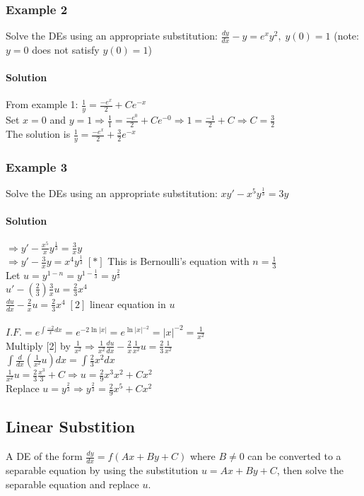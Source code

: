 \documentclass{article}
\begin{document}
\subsubsection{Example 2}
Solve the DEs using an appropriate substitution: $\frac{dy}{dx}-y=e^xy^2,\;y(0)=1$ (note: $y=0$ does not satisfy $y(0)=1$)
\paragraph{Solution} From example 1: $\frac{1}{y}=\frac{-e^x}{2}+Ce^{-x}$
\\Set $x=0$ and $y=1\Rightarrow \frac{1}{1}=\frac{-e^0}{2}+Ce^{-0}\Rightarrow1=\frac{-1}{2}+C\Rightarrow C=\frac{3}{2}$
\\The solution is $\frac{1}{y}=\frac{-e^x}{2}+\frac{3}{2}e^{-x}$

\subsubsection{Example 3}
Solve the DEs using an appropriate substitution: $xy'-x^5y^{\frac{1}{3}}=3y$
\paragraph{Solution} $\Rightarrow y'-\frac{x^5}{x}y^{\frac{1}{3}}=\frac{3}{x}y$
\\$\Rightarrow y'-\frac{3}{x}y=x^4y^{\frac{1}{3}}\;[*]$ This is Bernoulli's equation with $n=\frac{1}{3}$
\\Let $u=y^{1-n}=y^{1-\frac{1}{3}}=y^{\frac{2}{3}}$
\\$u'-(\frac{2}{3})\frac{3}{x}u=\frac{2}{3}x^4$
\\$\frac{du}{dx}-\frac{2}{x}u=\frac{2}{3}x^4\;[2]$ linear equation in $u$
\\\\$I.F.=e^{\int \frac{-2}{x}dx}=e^{-2\ln|x|}=e^{\ln|x|{^{-2}}}=|x|^{-2}=\frac{1}{x^2}$
\\Multiply [2] by $\frac{1}{x^2}\Rightarrow \frac{1}{x^2}\frac{du}{dx}-\frac{2}{x}\frac{1}{x^2}u=\frac{2}{3}\frac{1}{x^2}$
\\$\int\frac{d}{dx}(\frac{1}{x^2}u)dx=\int\frac{2}{3}x^2dx$
\\$\frac{1}{x^2}u=\frac{2}{3}\frac{x^3}{3}+C\Rightarrow u=\frac{2}{9}x^3x^2+Cx^2$
\\Replace $u=y^{\frac{2}{3}}\Rightarrow y^{\frac{2}{3}}=\frac{2}{9}x^5+Cx^2$

\subsection{Linear Substition}
A DE of the form $\frac{dy}{dx}=f(Ax+By+C)$ where $B\neq0$ can be converted to a separable equation by using the substitution $u=Ax+By+C$, then solve the separable equation and replace $u$.
\end{document}
